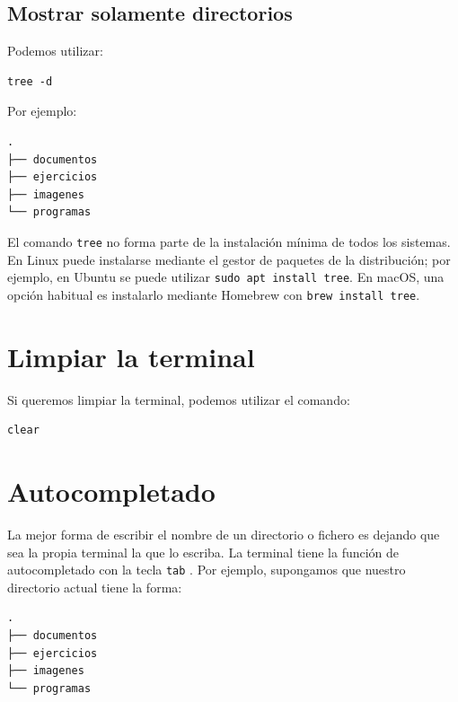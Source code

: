 \documentclass[11pt,a4paper]{article}
\begin{document}
\subsection{Mostrar solamente directorios}


Podemos utilizar:


\begin{lstlisting}
tree -d
\end{lstlisting}


\noindent Por ejemplo:


\begin{lstlisting}
.
├── documentos
├── ejercicios
├── imagenes
└── programas
\end{lstlisting}


\begin{importante}
El comando \texttt{tree} no forma parte de la instalación mínima de todos los sistemas. En Linux puede instalarse mediante el gestor de paquetes de la distribución; por ejemplo, en Ubuntu se puede utilizar \texttt{sudo apt install tree}. En macOS, una opción habitual es instalarlo mediante Homebrew con \texttt{brew install tree}.
\end{importante}








\section{Limpiar la terminal}


Si queremos limpiar la terminal, podemos utilizar el comando:


\begin{lstlisting}
clear
\end{lstlisting}








\section{Autocompletado}


La mejor forma de escribir el nombre de un directorio o fichero es dejando que sea la propia terminal la que lo escriba. La terminal tiene la función de autocompletado con la tecla \texttt{tab} \keys{\tab}. Por ejemplo, supongamos que nuestro directorio actual tiene la forma:


\begin{lstlisting}
.
├── documentos
├── ejercicios
├── imagenes
└── programas
\end{lstlisting}
\end{document}
